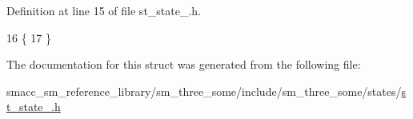 Definition at line 15 of file st\+\_\+state\+\_.\+h.


\begin{DoxyCode}
16     \{
17     \}
\end{DoxyCode}


The documentation for this struct was generated from the following file\+:\begin{DoxyCompactItemize}
\item 
smacc\+\_\+sm\+\_\+reference\+\_\+library/sm\+\_\+three\+\_\+some/include/sm\+\_\+three\+\_\+some/states/\hyperlink{st__state__4_8h}{st\+\_\+state\+\_.\+h}\end{DoxyCompactItemize}
